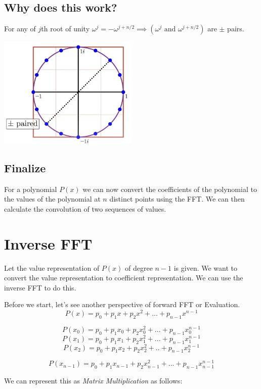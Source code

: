 \documentclass[28]{report}
\begin{document}
\section{Why does this work?}
For any of $j$th root of unity $\omega^j = - \omega^{j + n/2} \implies (\omega^j \text{ and } \omega^{j + n/2})$ are $\pm$ pairs.\\


\begin{center}
    \includegraphics[width=0.5\textwidth]{images/rootsOfUnity.jpg}
\end{center}

 
\section{Finalize}
For a polynomial $P(x)$ we can now convert the coefficients of the polynomial to the values of the polynomial at \(n\) distinct points using the FFT. We can then calculate the convolution of two sequences of values. 

\chapter{Inverse FFT}
Let the value representation of $P(x)$ of degree $n-1$  is given. We want to convert the value representation to coefficient representation. We can use the inverse FFT to do this. \newline

Before we start, let's see another perspective of forward FFT or Evaluation.
$$P(x) = p_0 + p_1x + p_2x^2 + ... + p_{n-1}x^{n-1}$$

$$ P(x_0) = p_0 + p_1x_0 + p_2x_0^2 + ... + p_{n-1}x_0^{n-1}$$
$$ P(x_1) = p_0 + p_1x_1 + p_2x_1^2 +... + p_{n-1}x_1^{n-1} $$
$$ P(x_2) = p_0 + p_1x_2 + p_2x_2^2 + .. + p_{n-1}x_2^{n-1} $$

$$ P(x_{n-1}) = p_0 + p_1x_{n-1} + p_2x_{n-1}^2 + ... + p_{n-1}x_{n-1}^{n-1} $$

We can represent this as \textit{Matrix Multiplication} as follows:
\end{document}
